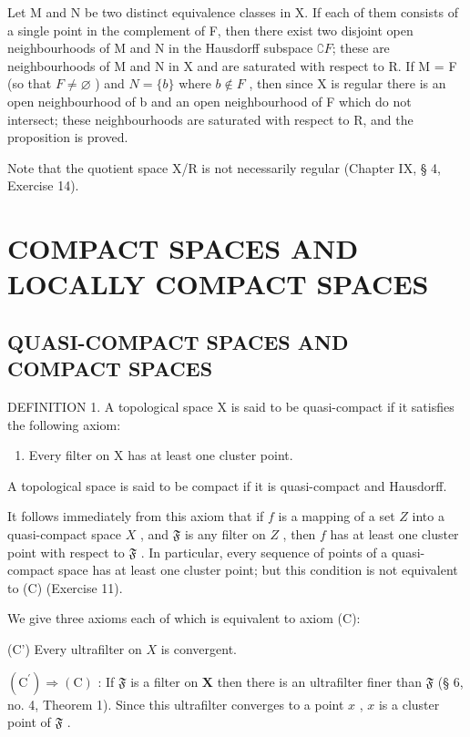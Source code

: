 Let M and N be two distinct equivalence classes in X. If each of them consists of a single point in the complement of F, then there exist two disjoint open neighbourhoods of M and N in the Hausdorff subspace \(\complement F\); these are neighbourhoods of M and N in X and are saturated with respect to R. If M = F (so that \(F \neq \varnothing\) ) and \(N = \{b\}\) where \(b \notin F\) , then since X is regular there is an open neighbourhood of b and an open neighbourhood of F which do not intersect; these neighbourhoods are saturated with respect to R, and the proposition is proved.

Note that the quotient space X/R is not necessarily regular (Chapter IX, § 4, Exercise 14).

\section{COMPACT SPACES AND LOCALLY COMPACT SPACES}

\subsection{QUASI-COMPACT SPACES AND COMPACT SPACES}

DEFINITION 1. A topological space X is said to be quasi-compact if it satisfies the following axiom:

\begin{enumerate}
\def\labelenumi{(\Alph{enumi})}
\setcounter{enumi}{2}
\tightlist
\item
  Every filter on X has at least one cluster point.
\end{enumerate}

A topological space is said to be compact if it is quasi-compact and Hausdorff.

It follows immediately from this axiom that if \(f\) is a mapping of a set \(Z\) into a quasi-compact space \(X\) , and \(\mathfrak{F}\) is any filter on \(Z\) , then \(f\) has at least one cluster point with respect to \(\mathfrak{F}\) . In particular, every sequence of points of a quasi-compact space has at least one cluster point; but this condition is not equivalent to (C) (Exercise 11).

We give three axioms each of which is equivalent to axiom (C):

(C') Every ultrafilter on \(X\) is convergent.

\((\mathrm{C}^{\prime}) \Longrightarrow (\mathrm{C})\) : If \(\mathfrak{F}\) is a filter on \(\mathbf{X}\) then there is an ultrafilter finer than \(\mathfrak{F}\) (§ 6, no. 4, Theorem 1). Since this ultrafilter converges to a point \(x\) , \(x\) is a cluster point of \(\mathfrak{F}\) .

